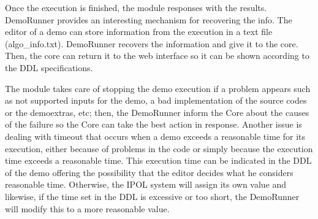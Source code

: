 Once the execution is finished, the module responses with the results. DemoRunner provides an interesting mechanism for recovering the info. The editor of a demo can store information from the execution in a text file (algo\_info.txt). DemoRunner recovers the information and give it to the core. Then, the core can return it to the web interface so it can be shown according to the DDL specifications.

The module takes care of stopping the demo execution if a problem appears such as not supported inputs for the demo, a bad implementation of the source codes or the demoextras, etc; then, the DemoRunner inform the Core about the causes of the failure so the Core can take the best action in response. Another issue is dealing with timeout that occurs when a demo exceeds a reasonable time for its execution, either because of problems in the code or simply because the execution time exceeds a reasonable time. This execution time can be indicated in the DDL of the demo offering the possibility that the editor decides what he considers reasonable time. Otherwise, the IPOL system will assign its own value and likewise, if the time set in the DDL is excessive or too short, the DemoRunner will modify this to a more reasonable value.